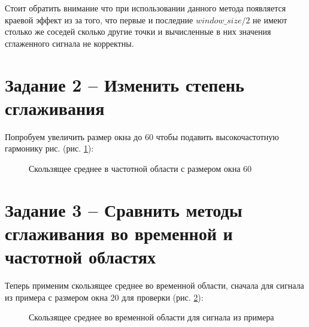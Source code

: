 \documentclass[a4paper,oneside,14pt]{extreport}
\begin{document}
Стоит обратить внимание что при использовании данного метода появляется краевой эффект из за того, что первые и последние $window\_size/2$ не имеют столько же соседей сколько другие точки и вычисленные в них значения сглаженного сигнала не корректны.

\newpage
\section*{Задание 2 – Изменить степень сглаживания}

Попробуем увеличить размер окна до 60 чтобы подавить высокочастотную гармонику рис. (рис. \ref{task2_my_signal}):

\begin{figure}[h]
	\caption{Скользящее среднее в частотной области с размером окна 60}
	\label{task2_my_signal}
\end{figure}

\newpage
\section*{Задание 3 – Сравнить методы сглаживания во временной и частотной областях}

Теперь применим скользящее среднее во временной области, сначала для сигнала из примера с размером окна 20 для проверки (рис. \ref{task3_not_my_signal}):

\begin{figure}[h]
	\caption{Скользящее среднее во временной области для сигнала из примера}
	\label{task3_not_my_signal}
\end{figure}
\end{document}
